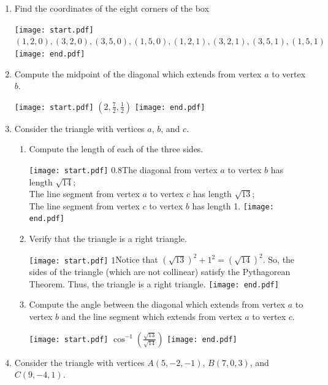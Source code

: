 \documentclass[12pt]{article}
\begin{document}
\begin{enumerate}

\item Find the coordinates of the eight corners of the box

\texttt{[image: start.pdf]}
{{$(1,2,0), (3,2,0), (3,5,0), (1,5,0), (1,2,1), (3,2,1), (3,5,1), (1,5,1)$}}
\texttt{[image: end.pdf]}


\item Compute the midpoint of the diagonal which extends from vertex $a$ to vertex $b$.

\texttt{[image: start.pdf]}
{{$\left(2,\frac{7}{2},\frac{1}{2}\right)$}}
\texttt{[image: end.pdf]}


\item Consider the triangle with vertices $a$, $b$, and $c$.

\begin{enumerate}

\item Compute the length of each of the three sides.

\texttt{[image: start.pdf]}
{{{0.8\linewidth}{The diagonal from vertex $a$ to vertex $b$ has length $\sqrt{14}$;\\
The line segment from vertex $a$ to vertex $c$ has length $\sqrt{13}$;\\
The line segment from vertex $c$ to vertex $b$ has length 1.}}}
\texttt{[image: end.pdf]}


\item Verify that the triangle is a right triangle.

\texttt{[image: start.pdf]}
{{{1\linewidth}{Notice that $\left(\sqrt{13}\right)^2+1^2=\left(\sqrt{14}\right)^2$.  So, the sides of the triangle (which are not collinear) satisfy the Pythagorean Theorem.  Thus, the triangle is a right triangle.}}}
\texttt{[image: end.pdf]}


\item Compute the angle between the diagonal which extends from vertex $a$ to vertex $b$ and the line segment which extends from vertex $a$ to vertex $c$.

\texttt{[image: start.pdf]}
{{$\cos^{-1}\left(\frac{\sqrt{13}}{\sqrt{14}}\right)$}}
\texttt{[image: end.pdf]}


\end{enumerate}

\item Consider the triangle with vertices $A(5,-2,-1)$, $B(7,0,3)$, and $C(9,-4,1)$.

\begin{enumerate}


\end{enumerate}
\end{enumerate}
\end{document}
